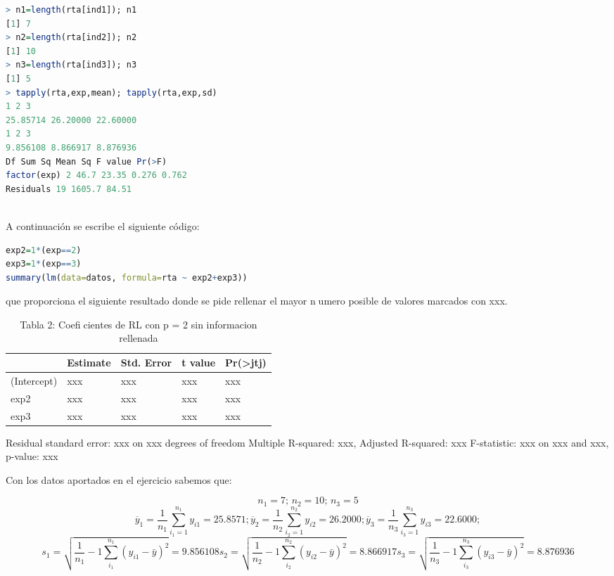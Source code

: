 \documentclass[12pt,spanish]{article}
\begin{document}
\begin{lstlisting}[language=R]
> n1=length(rta[ind1]); n1
[1] 7
> n2=length(rta[ind2]); n2
[1] 10
> n3=length(rta[ind3]); n3
[1] 5
> tapply(rta,exp,mean); tapply(rta,exp,sd)
1 2 3
25.85714 26.20000 22.60000
1 2 3
9.856108 8.866917 8.876936
Df Sum Sq Mean Sq F value Pr(>F)
factor(exp) 2 46.7 23.35 0.276 0.762
Residuals 19 1605.7 84.51
\end{lstlisting}
\\
A continuación se escribe el siguiente código:\\

\begin{lstlisting}[language=R]
exp2=1*(exp==2)
exp3=1*(exp==3)
summary(lm(data=datos, formula=rta ~ exp2+exp3))
\end{lstlisting}

que proporciona el siguiente resultado donde se pide rellenar el mayor numero posible de valores marcados con xxx.

\begin{table}[]
\begin{tabular}{@{}lllll@{}}
\toprule
            & Estimate & Std. Error & t value & Pr(\textgreater jtj) \\ \midrule
(Intercept) & xxx      & xxx        & xxx     & xxx                  \\
exp2        & xxx      & xxx        & xxx     & xxx                  \\
exp3        & xxx      & xxx        & xxx     & xxx                  \\ \bottomrule
\end{tabular}
\caption{Tabla 2: Coeficientes de RL con p = 2 sin informacion rellenada}
\end{table}


Residual standard error: xxx on xxx degrees of freedom 
Multiple R-squared: xxx, Adjusted R-squared: xxx 
F-statistic: xxx on xxx and xxx, p-value: xxx 



Con los datos aportados en el ejercicio sabemos que:

\[

 n_1 = 7; \,  n_2 = 10; \,  n_3 = 5
 \]
 \[

 \overline{y}_1 = \frac{1}{n_1}\sum\limits_{i_1 = 1}^{n_1} {y_{i1} } = 25.8571; %
  \overline{y}_2 = \frac{1}{n_2}\sum\limits_{i_2 = 1}^{n_2} {y_{i2} } = 26.2000;  %
   \overline{y}_3 = \frac{1}{n_3}\sum\limits_{i_3 = 1}^{n_3} {y_{i3} } = 22.6000;
  \]
\[

s_1  = \sqrt {\frac{1}{n_1}-1\sum\limits_{i_1}^{n_1} {\left( {y_{i1}  - \bar y} \right)^2 } } = 9.856108

s_2  = \sqrt {\frac{1}{n_2}-1\sum\limits_{i_2}^{n_2} {\left( {y_{i2}  - \bar y} \right)^2 } } = 8.866917 

s_3  = \sqrt {\frac{1}{n_3}-1\sum\limits_{i_3}^{n_3} {\left( {y_{i3}  - \bar y} \right)^2 } } = 8.876936 
\]
\end{document}
